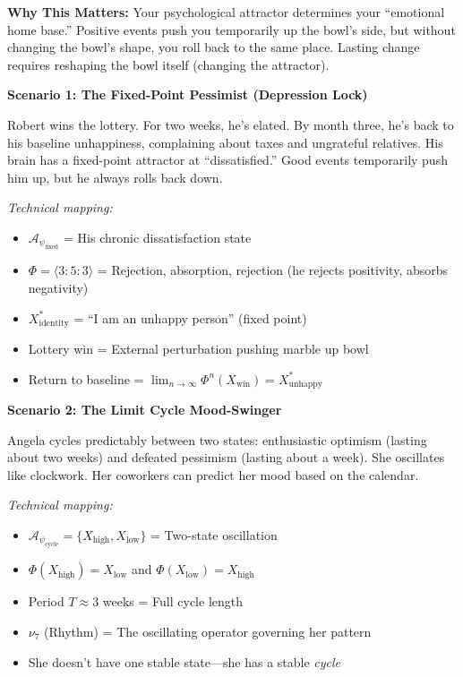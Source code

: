 \documentclass[11pt,twoside]{book}
\newcommand{\noe}[1]{\nu_{#1}}
\newcommand{\Frac}{\Phi}
\newcommand{\PsychAttractor}{\mathcal{A}_\psi}
\begin{document}
\begin{tcolorbox}[colback=green!5!white,colframe=green!65!black,title=\textbf{Plain English: What is a Psychological Attractor?},breakable]
\textbf{Why This Matters:}
Your psychological attractor determines your ``emotional home base.'' Positive events push you temporarily up the bowl's side, but without changing the bowl's shape, you roll back to the same place. Lasting change requires reshaping the bowl itself (changing the attractor).

\end{tcolorbox}

\begin{tcolorbox}[colback=yellow!5!white,colframe=yellow!65!black,title=\textbf{Real-Life Scenarios: Psychological Attractors},breakable]

\textbf{Scenario 1: The Fixed-Point Pessimist (Depression Lock)}

Robert wins the lottery. For two weeks, he's elated. By month three, he's back to his baseline unhappiness, complaining about taxes and ungrateful relatives. His brain has a fixed-point attractor at ``dissatisfied.'' Good events temporarily push him up, but he always rolls back down.

\textit{Technical mapping:}
\begin{itemize}
    \item $\PsychAttractor_{\mathrm{fixed}}$ = His chronic dissatisfaction state
    \item $\Frac = \langle 3:5:3 \rangle$ = Rejection, absorption, rejection (he rejects positivity, absorbs negativity)
    \item $X^*_{\mathrm{identity}}$ = ``I am an unhappy person'' (fixed point)
    \item Lottery win = External perturbation pushing marble up bowl
    \item Return to baseline = $\lim_{n \to \infty} \Frac^n(X_{\mathrm{win}}) = X^*_{\mathrm{unhappy}}$
\end{itemize}

\textbf{Scenario 2: The Limit Cycle Mood-Swinger}

Angela cycles predictably between two states: enthusiastic optimism (lasting about two weeks) and defeated pessimism (lasting about a week). She oscillates like clockwork. Her coworkers can predict her mood based on the calendar.

\textit{Technical mapping:}
\begin{itemize}
    \item $\PsychAttractor_{\mathrm{cycle}} = \{X_{\mathrm{high}}, X_{\mathrm{low}}\}$ = Two-state oscillation
    \item $\Frac(X_{\mathrm{high}}) = X_{\mathrm{low}}$ and $\Frac(X_{\mathrm{low}}) = X_{\mathrm{high}}$
    \item Period $T \approx 3$ weeks = Full cycle length
    \item $\noe{7}$ (Rhythm) = The oscillating operator governing her pattern
    \item She doesn't have one stable state---she has a stable \textit{cycle}
\end{itemize}


\end{tcolorbox}
\end{document}
